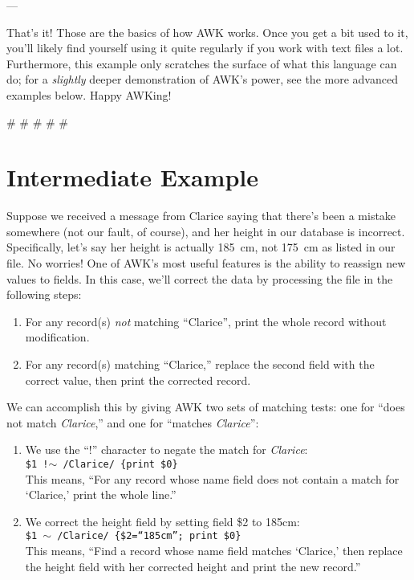 \documentclass[10pt,a4]{article}
\begin{document}
---

That's it! Those are the basics of how AWK works. Once you get a bit used to it, you'll likely find yourself using it quite regularly if you work with text files a lot. Furthermore, this example only scratches the surface of what this language can do; for a \emph{slightly} deeper demonstration of AWK's power, see the more advanced examples below. Happy AWKing!



\# \# \# \# \#



\pagebreak

\section*{Intermediate Example}

Suppose we received a message from Clarice saying that there's been a mistake somewhere (not our fault, of course), and her height in our database is incorrect. Specifically, let's say her height is actually 185~cm, not 175~cm as listed in our file.
No worries! One of AWK's most useful features is the ability to reassign new values to fields.
In this case, we'll correct the data by processing the file in the following steps:
\begin{enumerate}
  \item For any record(s) \emph{not} matching ``Clarice'', print the whole record without modification.
  \item For any record(s) matching ``Clarice,'' replace the second field with the correct value, then print the corrected record.
\end{enumerate}

We can accomplish this by giving AWK two sets of matching tests: one for ``does not match \emph{Clarice},'' and one for ``matches \emph{Clarice}'':

\begin{enumerate}
  \item We use the ``!'' character to negate the match for \emph{Clarice}:\\
  \texttt{\$1 !$\sim$ /Clarice/ \{print \$0\}}\\
  This means, ``For any record whose name field does not contain a match for `Clarice,' print the whole line.''
  \item We correct the height field by setting field \$2 to 185cm:\\
  \texttt{\$1 $\sim$ /Clarice/ \{\$2=``185cm''; print \$0\}}\\
  This means, ``Find a record whose name field matches `Clarice,' then replace the height field with her corrected height and print the new record.''
\end{enumerate}
\end{document}
